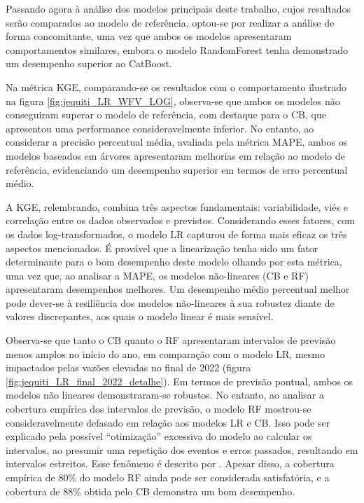 Passando agora à análise dos modelos principais deste trabalho, cujos resultados serão comparados ao modelo de referência, optou-se por realizar a análise de forma concomitante, uma vez que ambos os modelos apresentaram comportamentos similares, embora o modelo RandomForest tenha demonstrado um desempenho superior ao CatBoost.

Na métrica KGE, comparando-se os resultados com o comportamento ilustrado na figura \ref{fig:jequiti_LR_WFV_LOG}, observa-se que ambos os modelos não conseguiram superar o modelo de referência, com destaque para o CB, que apresentou uma performance consideravelmente inferior. No entanto, ao considerar a precisão percentual média, avaliada pela métrica MAPE, ambos os modelos baseados em árvores apresentaram melhorias em relação ao modelo de referência, evidenciando um desempenho superior em termos de erro percentual médio.

A KGE, relembrando, combina três aspectos fundamentais: variabilidade, viés e correlação entre os dados observados e previstos. Considerando esses fatores, com os dados log-transformados, o modelo LR capturou de forma mais eficaz os três aspectos mencionados. É provável que a linearização tenha sido um fator determinante para o bom desempenho deste modelo olhando por esta métrica, uma vez que, ao analisar a MAPE, os modelos não-lineares (CB e RF) apresentaram desempenhos melhores. Um desempenho médio percentual melhor pode dever-se à resiliência dos modelos não-lineares à sua robustez diante de valores discrepantes, aos quais o modelo linear é mais sensível.

Observa-se que tanto o CB quanto o RF apresentaram intervalos de previsão menos amplos no início do ano, em comparação com o modelo LR, mesmo impactados pelas vazões elevadas no final de 2022 (figura \ref{fig:jequiti_LR_final_2022_detalhe}). Em termos de previsão pontual, ambos os modelos não lineares demonstraram-se robustos. No entanto, ao analisar a cobertura empírica dos intervalos de previsão, o modelo RF mostrou-se consideravelmente defasado em relação aos modelos LR e CB. Isso pode ser explicado pela possível ``otimização'' excessiva do modelo ao calcular os intervalos, ao presumir uma repetição dos eventos e erros passados, resultando em intervalos estreitos. Esse fenômeno é descrito por \citet{RobHyndman_prediction_intervals}. Apesar disso, a cobertura empírica de $80\%$ do modelo RF ainda pode ser considerada satisfatória, e a cobertura de $88\%$ obtida pelo CB demonstra um bom desempenho.

